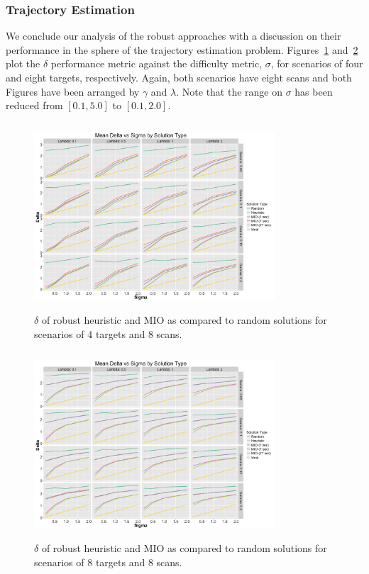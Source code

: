 \documentclass[journal]{IEEEtran}
\begin{document}
\subsubsection{Trajectory Estimation}
We conclude our analysis of the robust approaches with a discussion on their performance in the sphere of the trajectory estimation problem. Figures~\ref{fig:Robust_4_8_Delta} and~\ref{fig:Robust_8_8_Delta} plot the $\delta$ performance metric against the difficulty metric, $\sigma$, for scenarios of four and eight targets, respectively. Again, both scenarios have eight scans and both Figures have been arranged by $\gamma$ and $\lambda$. Note that the range on $\sigma$ has been reduced from $[0.1,5.0]$ to $[0.1, 2.0]$. 

\begin{figure}[h]
  \centering
  \includegraphics[width=9cm, height=7cm]{4_8_Delta}
  \caption{$\delta$ of robust heuristic and MIO as compared to random solutions for scenarios of 4 targets and 8 scans.}
  \label{fig:Robust_4_8_Delta}
\end{figure}

\begin{figure}[h]
  \centering
  \includegraphics[width=9cm, height=7cm]{8_8_Delta}
  \caption{$\delta$ of robust heuristic and MIO as compared to random solutions for scenarios of 8 targets and 8 scans.}
  \label{fig:Robust_8_8_Delta}
\end{figure}
\end{document}

